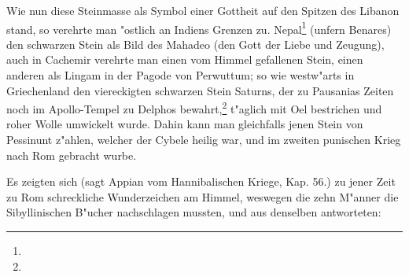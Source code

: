 \documentclass[a4paper, 11pt, oneside, polutonikogreek, german]{article}
\begin{document}
Wie nun diese Steinmasse als Symbol einer Gottheit auf den Spitzen des Libanon stand, so verehrte man "ostlich an Indiens Grenzen zu. Nepal\footnote{} (unfern Benares) den schwarzen Stein als Bild des Mahadeo (den Gott der Liebe und Zeugung), auch in Cachemir verehrte man einen vom Himmel gefallenen Stein, einen anderen als Lingam in der Pagode von Perwuttum; so wie westw"arts in Griechenland den viereckigten schwarzen Stein Saturns, der zu Pausanias Zeiten noch im Apollo-Tempel zu Delphos bewahrt,\footnote{} t"aglich mit Oel bestrichen und roher Wolle umwickelt wurde. Dahin kann man gleichfalls jenen Stein von Pessinunt z"ahlen, welcher der Cybele heilig war, und im zweiten punischen Krieg nach Rom gebracht wurbe.

Es zeigten sich (sagt Appian vom Hannibalischen Kriege, Kap. 56.) zu jener Zeit zu Rom schreckliche Wunderzeichen am Himmel, weswegen die zehn M"anner die Sibyllinischen B"ucher nachschlagen mussten, und aus denselben antworteten:
\end{document}
